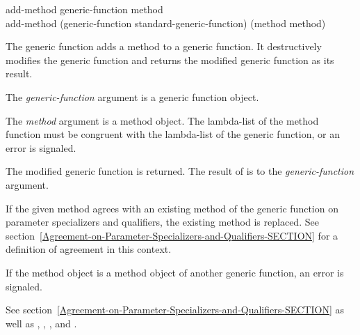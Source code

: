 \begin{defun}
add-method generic-function method \\
add-method (generic-function standard-generic-function) (method method)

The generic function  adds a method to a generic
function.  It destructively modifies the generic function and returns
the modified generic function as its result.

The \emph{generic-function} argument is a generic function
object.

The \emph{method} argument is a method object.  The lambda-list of
the method function must be congruent with the lambda-list of the
generic function, or an error is signaled.

The modified generic function is returned.  The result of  
is  to the \emph{generic-function} argument.

If the given method agrees with an existing method of the generic
function on parameter specializers and qualifiers, the existing method
is replaced.  See section~\ref{Agreement-on-Parameter-Specializers-and-Qualifiers-SECTION}
for a definition of agreement in this context.

If the method object is a method object of another generic function,
an error is signaled.

See section~\ref{Agreement-on-Parameter-Specializers-and-Qualifiers-SECTION}
as well as
,
,
,
and .
\end{defun}

